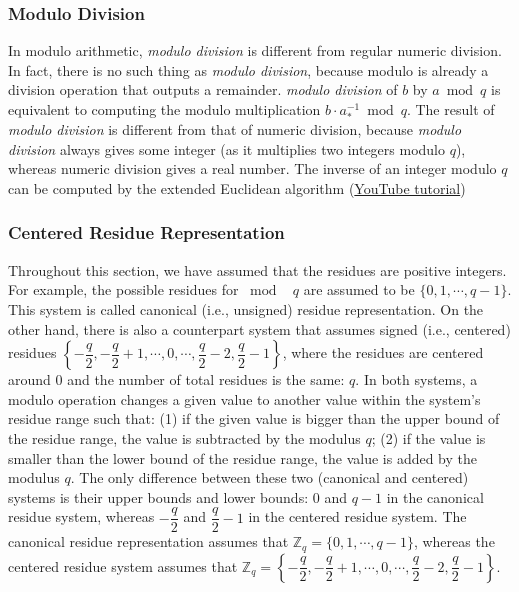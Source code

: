 \subsubsection{Modulo Division}
\label{subsec:modulo-division}

In modulo arithmetic, \textit{modulo division} is different from regular numeric division. In fact, there is no such thing as \textit{modulo division}, because modulo is already a division operation that outputs a remainder. \textit{modulo division} of $b$ by $a \bmod q$ is equivalent to computing the modulo multiplication $b \cdot a_*^{-1} \bmod q$. The result of \textit{modulo division} is different from that of numeric division, because \textit{modulo division} always gives some integer (as it multiplies two integers modulo $q$), whereas numeric division gives a real number. The inverse of an integer modulo $q$ can be computed by the extended Euclidean algorithm (\href{https://www.youtube.com/watch?v=fz1vxq5ts5I}{YouTube tutorial})

\subsubsection{Centered Residue Representation}
\label{subsec:modulo-centered}

Throughout this section, we have assumed that the residues are positive integers. For example, the possible residues for $\bmod \text{ } q$ are assumed to be $\{0, 1, \cdots, q-1\}$. This system is called canonical (i.e., unsigned) residue representation. On the other hand, there is also a counterpart system that assumes signed (i.e., centered) residues $\left\{-\dfrac{q}{2}, -\dfrac{q}{2} + 1, \cdots, 0, \cdots, \dfrac{q}{2} - 2, \dfrac{q}{2} - 1\right\}$, where the residues are centered around $0$ and the number of total residues is the same: $q$. In both systems, a modulo operation changes a given value to another value within the system's residue range such that: (1) if the given value is bigger than the upper bound of the residue range, the value is subtracted by the modulus $q$; (2) if the value is smaller than the lower bound of the residue range, the value is added by the modulus $q$. The only difference between these two (canonical and centered) systems is their upper bounds and lower bounds: $0$ and $q-1$ in the canonical residue system, whereas $-\dfrac{q}{2}$ and $\dfrac{q}{2} - 1$ in the centered residue system. The canonical residue representation assumes that $\mathbb{Z}_q = \{0, 1, \cdots, q-1\}$, whereas the centered residue system assumes that $\mathbb{Z}_q = \left\{-\dfrac{q}{2}, -\dfrac{q}{2} + 1, \cdots, 0, \cdots, \dfrac{q}{2} - 2, \dfrac{q}{2} - 1\right\}$. 


